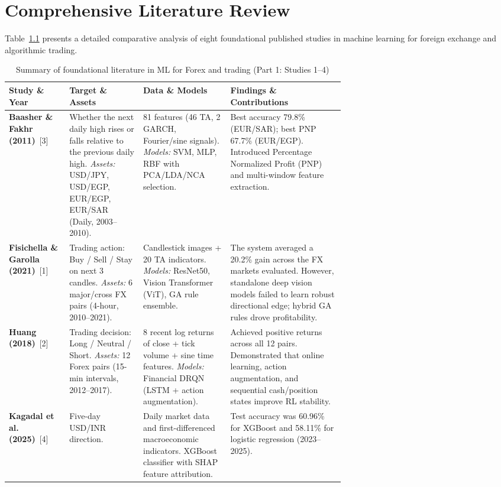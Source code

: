 \documentclass[12pt,a4paper,twoside,openany]{report}
\begin{document}
\chapter{Comprehensive Literature Review}\label{app:lit-review}

Table~\ref{tab:lit-review-summary} presents a detailed comparative analysis of eight foundational published studies in machine learning for foreign exchange and algorithmic trading.

\begin{table}[htbp]\centering\small\singlespacing
\caption{Summary of foundational literature in ML for Forex and trading (Part 1: Studies 1--4)}\label{tab:lit-review-summary}
\begin{tabularx}{\linewidth}{@{}p{0.18\linewidth}p{0.22\linewidth}p{0.26\linewidth}X@{}}\toprule
\textbf{Study \& Year} & \textbf{Target \& Assets} & \textbf{Data \& Models} & \textbf{Findings \& Contributions}\\\midrule
\textbf{Baasher \& Fakhr (2011)}~[3] & 
Whether the next daily high rises or falls relative to the previous daily high. \newline 
\textit{Assets:} USD/JPY, USD/EGP, EUR/EGP, EUR/SAR (Daily, 2003--2010). & 
81 features (46 TA, 2 GARCH, Fourier/sine signals). \newline 
\textit{Models:} SVM, MLP, RBF with PCA/LDA/NCA selection. & 
Best accuracy 79.8\% (EUR/SAR); best PNP 67.7\% (EUR/EGP). Introduced Percentage Normalized Profit (PNP) and multi-window feature extraction. \\\midrule
\textbf{Fisichella \& Garolla (2021)}~[1] & 
Trading action: Buy / Sell / Stay on next 3 candles. \newline 
\textit{Assets:} 6 major/cross FX pairs (4-hour, 2010--2021). & 
Candlestick images + 20 TA indicators. \newline 
\textit{Models:} ResNet50, Vision Transformer (ViT), GA rule ensemble. & 
The system averaged a 20.2\% gain across the FX markets evaluated. However, standalone deep vision models failed to learn robust directional edge; hybrid GA rules drove profitability. \\\midrule
\textbf{Huang (2018)}~[2] & 
Trading decision: Long / Neutral / Short. \newline 
\textit{Assets:} 12 Forex pairs (15-min intervals, 2012--2017). & 
8 recent log returns of close + tick volume + sine time features. \newline 
\textit{Models:} Financial DRQN (LSTM + action augmentation). & 
Achieved positive returns across all 12 pairs. Demonstrated that online learning, action augmentation, and sequential cash/position states improve RL stability. \\\midrule
\textbf{Kagadal et al. (2025)}~[4] &
Five-day USD/INR direction. &
Daily market data and first-differenced macroeconomic indicators. XGBoost classifier with SHAP feature attribution. &
Test accuracy was 60.96\% for XGBoost and 58.11\% for logistic regression (2023--2025). \\
\bottomrule\end{tabularx}
\end{table}
\end{document}
